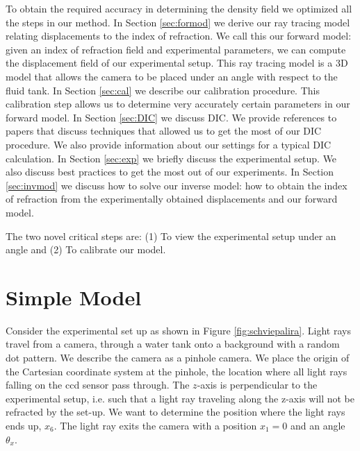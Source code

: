 \documentclass[smallextended]{svjour3}       %
\begin{document}
To obtain the required accuracy in determining the density field we optimized all the steps in our method. In Section \ref{sec:formod} we derive our ray tracing model relating displacements to the index of refraction. We call this our forward model: given an index of refraction field and experimental parameters, we can compute the displacement field of our experimental setup. This ray tracing model is a 3D model that allows the camera to be placed under an angle with respect to the fluid tank. In Section \ref{sec:cal} we describe our calibration procedure. This calibration step allows us to determine very accurately certain parameters in our forward model.  In Section \ref{sec:DIC} we discuss DIC. We provide references to papers that discuss techniques that allowed us to get the most of our DIC procedure. We also provide information about our settings for a typical DIC calculation. In Section \ref{sec:exp} we briefly discuss the experimental setup. We also discuss best practices to get the most out of our experiments. In Section \ref{sec:invmod} we discuss how to solve our inverse model: how to obtain the index of refraction from the experimentally obtained displacements and our forward model. 

The two novel critical steps are: (1) To view the experimental setup under an angle and (2) To calibrate our model. 

\section{Simple Model}
\label{sec:simmod}
Consider the experimental set up as shown in Figure \ref{fig:schviepalira}. Light rays travel from a camera, through a water tank onto a background with a random dot pattern.  We describe the camera as a pinhole camera. We place the origin of the Cartesian coordinate system at the pinhole, the location where all light rays falling on the ccd sensor pass through. The $z$-axis is perpendicular to the experimental setup, i.e. such that a light ray traveling along the z-axis will not be refracted by the set-up. We want to determine the position where the light rays ends up, $x_6$. The light ray exits the camera with a position $x_1 = 0$ and an angle $\theta_x$. %

%	
\end{document}
